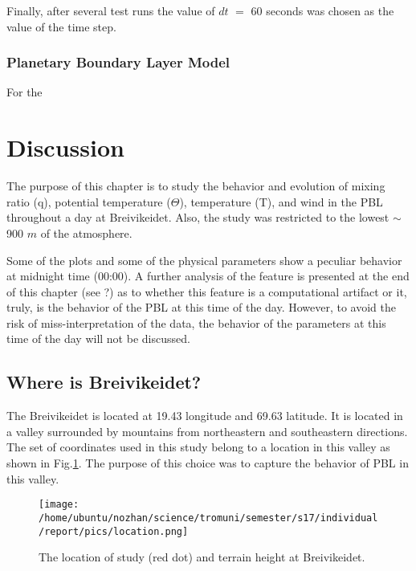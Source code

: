 \documentclass[a4paper,12pt]{article}
\numberwithin{equation}{section} %
\begin{document}
\vspace{0.25cm}

Finally, after several test runs the value of $dt$ $=$ $60$ seconds was chosen as the value of the time step.

\subsubsection{Planetary Boundary Layer Model}

For the 

\newpage

\section{Discussion}

The purpose of this chapter is to study the behavior and evolution of mixing ratio (q), potential temperature ($\Theta$), temperature (T), and wind in the PBL throughout a day at Breivikeidet. Also, the study was restricted to the lowest $\sim$ 900 $m$ of the atmosphere.

Some of the plots and some of the physical parameters show a peculiar behavior at midnight time (00:00). A further analysis of the feature is presented at the end of this chapter (see ?) as to whether this feature is a computational artifact or it, truly, is the behavior of the PBL at this time of the day. However, to avoid the risk of miss-interpretation of the data, the behavior of the parameters at this time of the day will not be discussed.

\subsection{Where is Breivikeidet?}

The Breivikeidet is located at 19.43 longitude and 69.63 latitude. It is located in a valley surrounded by mountains from northeastern and southeastern directions. The set of coordinates used in this study belong to a location in this valley as shown in Fig.\ref{location}. The purpose of this choice was to capture the behavior of PBL in this valley.

\begin{figure}[bhp]
\texttt{[image: /home/ubuntu/nozhan/science/tromuni/semester/s17/individual/report/pics/location.png]}
\caption{The location of study (red dot) and terrain height at Breivikeidet.}
\label{location}
\end{figure}
\end{document}
